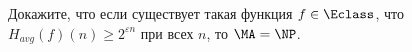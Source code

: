 Докажите, что если существует такая функция $f \in \Eclass$, что $H_{avg}(f)(n) \ge 2^{\varepsilon n}$
при всех $n$, то $\MA = \NP$.
